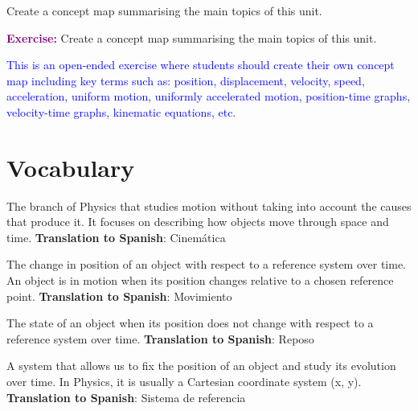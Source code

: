 \begin{exercise}
    Create a concept map summarising the main topics of this unit.
    \begin{solu}
        \textbf{\textcolor{purple}{Exercise:}} Create a concept map summarising the main topics of this unit.

        \textcolor{blue}{This is an open-ended exercise where students should create their own concept map including key terms such as: position, displacement, velocity, speed, acceleration, uniform motion, uniformly accelerated motion, position-time graphs, velocity-time graphs, kinematic equations, etc.}
    \end{solu}
\end{exercise}

\section{Vocabulary}

\begin{vocabulary}[Kinematics]
The branch of Physics that studies motion without taking into account the causes that produce it. It focuses on describing how objects move through space and time. \newline
\textbf{Translation to Spanish}: Cinemática \newline
\end{vocabulary}

\begin{vocabulary}[Motion]
The change in position of an object with respect to a reference system over time. An object is in motion when its position changes relative to a chosen reference point. \newline
\textbf{Translation to Spanish}: Movimiento \newline
\end{vocabulary}

\begin{vocabulary}[Rest]
The state of an object when its position does not change with respect to a reference system over time. \newline
\textbf{Translation to Spanish}: Reposo \newline
\end{vocabulary}

\begin{vocabulary}
A system that allows us to fix the position of an object and study its evolution over time. In Physics, it is usually a Cartesian coordinate system (x, y). \newline
\textbf{Translation to Spanish}: Sistema de referencia \newline
\end{vocabulary}

